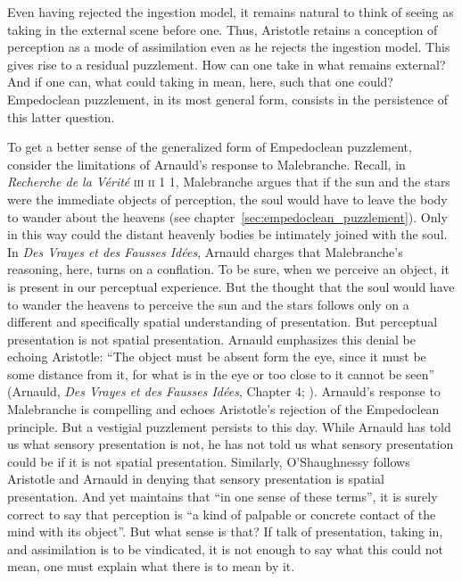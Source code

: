 Even having rejected the ingestion model, it remains natural to think of seeing as taking in the external scene before one. Thus, Aristotle retains a conception of perception as a mode of assimilation even as he rejects the ingestion model. This gives rise to a residual puzzlement. How can one take in what remains external? And if one can, what could taking in mean, here, such that one could? Empedoclean puzzlement, in its most general form, consists in the persistence of this latter question. 

To get a better sense of the generalized form of Empedoclean puzzlement, consider the limitations of Arnauld's response to Malebranche. Recall, in \emph{Recherche de la V\'{e}rit\'{e}} \textsc{iii} \textsc{ii} 1 1, Malebranche argues that if the sun and the stars were the immediate objects of perception, the soul would have to leave the body to wander about the heavens (see chapter~\ref{sec:empedoclean_puzzlement}). Only in this way could the distant heavenly bodies be intimately joined with the soul. In \emph{Des Vrayes et des Fausses Id\'{e}es}, Arnauld charges that Malebranche's reasoning, here, turns on a conflation. To be sure, when we perceive an object, it is present in our perceptual experience. But the thought that the soul would have to wander the heavens to perceive the sun and the stars follows only on a different and specifically spatial understanding of presentation. But perceptual presentation is not spatial presentation. Arnauld emphasizes this denial be echoing Aristotle: ``The object must be absent form the eye, since it must be some distance from it, for what is in the eye or too close to it cannot be seen'' (Arnauld, \emph{Des Vrayes et des Fausses Id\'{e}es}, Chapter 4; \citealt[62]{Gaukroger:1990rz}). Arnauld's response to Malebranche is compelling and echoes Aristotle's rejection of the Empedoclean principle. But a vestigial puzzlement persists to this day. While Arnauld has told us what sensory presentation is not, he has not told us what sensory presentation could be if it is not spatial presentation. Similarly, O'Shaughnessy follows Aristotle and Arnauld in denying that sensory presentation is spatial presentation. And yet \citet[183]{OShaughnessy:2003eu} maintains that ``in one sense of these terms'', it is surely correct to say that perception is ``a kind of palpable or concrete contact of the mind with its object''. But what sense is that? If talk of presentation, taking in, and assimilation is to be vindicated, it is not enough to say what this could not mean, one must explain what there is to mean by it.

